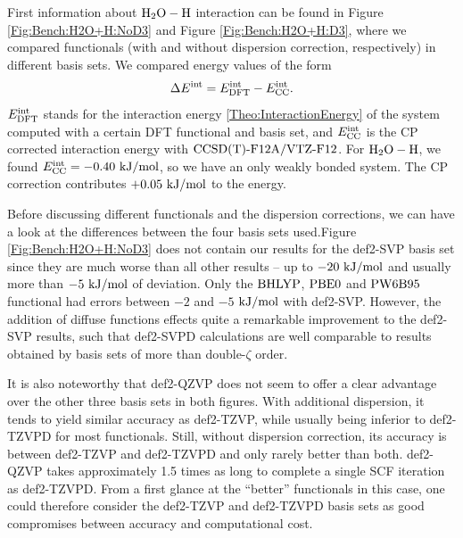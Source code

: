 \documentclass[8.5pt,twoside,twocolumn]{article}
\newcommand\eint{\enmat{E^{\te{int}}}}
\newcommand\dft{\enmat{_{\te{DFT}}}}
\newcommand\kmo{\enmat{\te {kJ/mol}}}
\theoremstyle{standard}
\begin{document}
First information about $\mbox{\ensuremath{\text H _2 \text O-\text H}}$ interaction can be found in Figure \ref{Fig:Bench:H2O+H:NoD3}
and Figure \ref{Fig:Bench:H2O+H:D3}, where
we compared functionals (with and without dispersion correction, respectively) in different basis sets. We compared
energy values of the form
\newcommand\ecc{\enmat{\eint_{\te {CC}}}}
\begin{equation}
\Dl\eint=\eint\dft-\ecc.
\label{Bench:RefEnergy}
\end{equation}
$\eint\dft$ stands for the interaction energy \eqref{Theo:InteractionEnergy} of the system computed with a certain
DFT functional and basis set, and $\ecc$ is the CP corrected interaction energy with $\text{CCSD(T)-F12A}/\text{VTZ-F}12$.
For $\mbox{\ensuremath{\text H _2 \text O-\text H}}$, we found \mbox{$\ecc=-0.40\ \kmo$}, so we have an only
weakly bonded system. The CP correction contributes $+0.05\ \kmo$ to
the energy.

Before discussing different functionals and the dispersion corrections, we can have a look
at the differences between the four basis sets used.Figure \ref{Fig:Bench:H2O+H:NoD3} does not contain our results
for the def2-SVP basis set since they are much worse than all other results --
up to $-20\ \kmo$ and usually more than $-5\ \kmo$ of deviation. Only the $\text{BHLYP}$, $\text{PBE0}$ and
$\text{PW6B95}$ functional had errors between $-2$ and $-5$ $\kmo$ with def2-SVP. However,
the addition of diffuse functions effects quite a remarkable improvement to the
def2-SVP results, such that def2-SVPD calculations are well comparable to 
results obtained by basis sets of more than double-$\zeta$ order.

It is also
noteworthy that def2-QZVP does not seem to offer a clear advantage over the
other three basis sets in both figures. With additional dispersion,
it tends to yield similar accuracy as def2-TZVP, while usually being inferior
to def2-TZVPD for most functionals. Still, without dispersion correction,
its accuracy is between def2-TZVP and def2-TZVPD and only rarely better
than both. def2-QZVP takes approximately 1.5 times as long to complete a single
SCF iteration as def2-TZVPD. From a first glance
at the ``better'' functionals in this case, one could therefore consider
the def2-TZVP and def2-TZVPD basis sets as good compromises between
accuracy and computational cost. 
\end{document}
